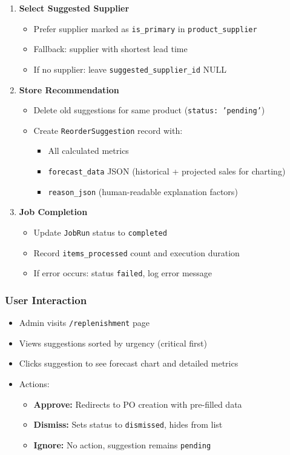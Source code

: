 \begin{enumerate}[leftmargin=*]
    \item \textbf{Select Suggested Supplier}
    \begin{itemize}
        \item Prefer supplier marked as \texttt{is\_primary} in \texttt{product\_supplier}
        \item Fallback: supplier with shortest lead time
        \item If no supplier: leave \texttt{suggested\_supplier\_id} NULL
    \end{itemize}
    
    \item \textbf{Store Recommendation}
    \begin{itemize}
        \item Delete old suggestions for same product (\texttt{status: 'pending'})
        \item Create \texttt{ReorderSuggestion} record with:
        \begin{itemize}
            \item All calculated metrics
            \item \texttt{forecast\_data} JSON (historical + projected sales for charting)
            \item \texttt{reason\_json} (human-readable explanation factors)
        \end{itemize}
    \end{itemize}
    
    \item \textbf{Job Completion}
    \begin{itemize}
        \item Update \texttt{JobRun} status to \texttt{completed}
        \item Record \texttt{items\_processed} count and execution duration
        \item If error occurs: status \texttt{failed}, log error message
    \end{itemize}
\end{enumerate}

\subsubsection{User Interaction}

\begin{itemize}
    \item Admin visits \texttt{/replenishment} page
    \item Views suggestions sorted by urgency (critical first)
    \item Clicks suggestion to see forecast chart and detailed metrics
    \item Actions:
    \begin{itemize}
        \item \textbf{Approve:} Redirects to PO creation with pre-filled data
        \item \textbf{Dismiss:} Sets status to \texttt{dismissed}, hides from list
        \item \textbf{Ignore:} No action, suggestion remains \texttt{pending}
    \end{itemize}
\end{itemize}

